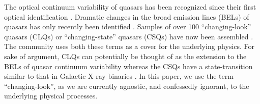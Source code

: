 \documentclass[fleqn,usenatbib]{mnras}
\begin{document}
The optical continuum variability of quasars has been recognized since
their first optical identification
\citep[e.g.,][]{MatthewsSandage1963}. %
Dramatic changes
in the broad emission lines (BELs) of quasars has only recently been
identified \citep[e.g., ][]{LaMassa2015}.  Samples of over 100
``changing-look'' quasars (CLQs) or ``changing-state'' quasars (CSQs)
have now been assembled \citep[e.g.,][]{MacLeod2019, Graham2019b}. The
community uses both these terms as a cover for the underlying
physics. For sake of argument, CLQs can potentially be thought of as
the extension to the BELs of quasar continuum variability \citep[e.g.,
][]{MacLeod2012} whereas the CSQs have a state-transition similar to
that in Galactic X-ray binaries \citep[][]{NodaDone2018, Ruan2019a}. In
this paper, we use the term ``changing-look'', as we are currently
agnostic, and confessedly ignorant, to the underlying physical
processes.
\end{document}

